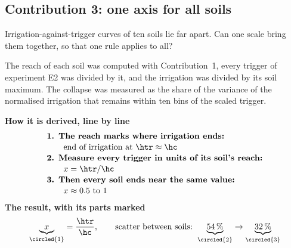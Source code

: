 \subsection{Contribution 3: one axis for all soils}
\begin{problem}
Irrigation-against-trigger curves of ten soils lie far apart. Can one scale bring them together, so that one rule applies to all?
\end{problem}
\begin{derivation}
The reach of each soil was computed with Contribution~1, every trigger of experiment E2 was divided by it, and the irrigation was divided by its soil maximum. The collapse was measured as the share of the variance of the normalised irrigation that remains within ten bins of the scaled trigger.
\end{derivation}
\begin{keyresult}
\begin{pencil}
{\small\noindent\textbf{How it is derived, line by line}
\[\begin{array}{@{}l@{}}\textbf{1. The reach marks where irrigation ends:}\\[1pt]
\qquad \text{end of irrigation at } \htr\approx\hc\\[1pt]
\textbf{2. Measure every trigger in units of its soil's reach:}\\[1pt]
\qquad x=\htr/\hc\\[1pt]
\textbf{3. Then every soil ends near the same value:}\\[1pt]
\qquad x\approx0.5\ \text{to}\ 1
\end{array}\]}
\noindent\textbf{The result, with its parts marked}
\[\underbrace{x}_{\circled{1}}=\frac{\htr}{\hc},\qquad \text{scatter between soils: }\underbrace{54\,\%}_{\circled{2}}\to\underbrace{32\,\%}_{\circled{3}}\]
\end{pencil}
\end{keyresult}
\begin{pins}
\end{pins}

